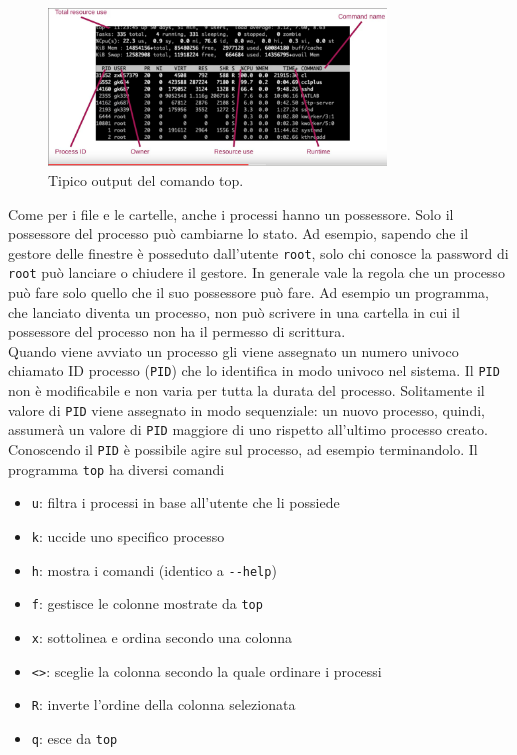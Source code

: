 \documentclass[11pt]{book}
\begin{document}
\begin{figure}
	\centering
	\includegraphics[width=0.8\textwidth]{img/top.png}
	\caption{Tipico output del comando top.}
	\label{top_out}
\end{figure}
Come per i file e le cartelle, anche i processi hanno un possessore. Solo il possessore del processo può cambiarne lo stato. Ad esempio, sapendo che il gestore delle finestre è posseduto dall'utente \verb"root", solo chi conosce la password di \verb"root" può lanciare o chiudere il gestore. In generale vale la regola che un processo può fare solo quello che il suo possessore può fare. Ad esempio un programma, che lanciato diventa un processo, non può scrivere in una cartella in cui il possessore del processo non ha il permesso di scrittura.\\
Quando viene avviato un processo gli viene assegnato un numero univoco chiamato ID processo (\verb"PID") che lo identifica in modo univoco nel sistema.
Il \verb"PID" non è modificabile e non varia per tutta la durata del processo. Solitamente il valore di \verb"PID" viene assegnato in modo sequenziale: un nuovo processo, quindi, assumerà un valore di \verb"PID" maggiore di uno rispetto all'ultimo processo creato.\\
Conoscendo il \verb"PID" è possibile agire sul processo, ad esempio terminandolo.
Il programma \verb"top" ha diversi comandi
\begin{itemize}
	\item \verb*|u|: filtra i processi in base all'utente che li possiede
	\item \verb*|k|: uccide uno specifico processo
	\item \verb*|h|: mostra i comandi (identico a \verb*|--help|)
	\item \verb*|f|: gestisce le colonne mostrate da \verb*|top|
	\item \verb*|x|: sottolinea e ordina secondo una colonna
	\item \verb*|<>|: sceglie la colonna secondo la quale ordinare i processi
	\item \verb*|R|: inverte l'ordine della colonna selezionata
	\item \verb*|q|: esce da \verb*|top|
\end{itemize}
\end{document}
